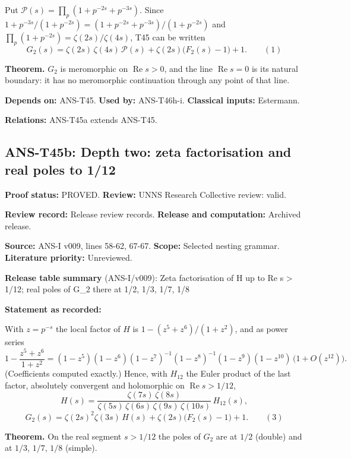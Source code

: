 \documentclass[
  11pt,
]{article}
\begin{document}
Put \(\mathcal P(s)=\prod_p(1+p^{-2s}+p^{-3s})\). Since
\(1+p^{-3s}/(1+p^{-2s})=(1+p^{-2s}+p^{-3s})/(1+p^{-2s})\) and
\(\prod_p(1+p^{-2s})=\zeta(2s)/\zeta(4s)\), T45 can be written
\[G_2(s)=\zeta(2s)\,\zeta(4s)\,\mathcal P(s)+\zeta(2s)\big(F_2(s)-1\big)+1.\qquad(1)\]

\textbf{Theorem.} \(G_2\) is meromorphic on \(\operatorname{Re}s>0\),
and the line \(\operatorname{Re}s=0\) is its natural boundary: it has no
meromorphic continuation through any point of that line.

\textbf{Depends on:} ANS-T45. \textbf{Used by:} ANS-T46h-i.
\textbf{Classical inputs:} Estermann.

\textbf{Relations:} ANS-T45a extends ANS-T45.

\hypertarget{ans-t45b-depth-two-zeta-factorisation-and-real-poles-to-112}{%
\subsection{ANS-T45b: Depth two: zeta factorisation and real poles to
1/12}\label{ans-t45b-depth-two-zeta-factorisation-and-real-poles-to-112}}

\textbf{Proof status:} PROVED. \textbf{Review:} UNNS Research Collective
review: valid.

\textbf{Review record:} Release review records. \textbf{Release and
computation:} Archived release.

\textbf{Source:} ANS-I v009, lines 58-62, 67-67. \textbf{Scope:}
Selected nesting grammar. \textbf{Literature priority:} Unreviewed.

\textbf{Release table summary} (ANS-I/v009): Zeta factorisation of H up
to Re s \textgreater{} 1/12; real poles of G\_2 there at 1/2, 1/3, 1/7,
1/8

\textbf{Statement as recorded:}

With \(z=p^{-s}\) the local factor of \(H\) is \(1-(z^5+z^6)/(1+z^2)\),
and as power series
\[1-\frac{z^5+z^6}{1+z^2}=(1-z^5)(1-z^6)(1-z^7)^{-1}(1-z^8)^{-1}(1-z^9)(1-z^{10})\,\big(1+O(z^{12})\big).\]
(Coefficients computed exactly.) Hence, with \(H_{12}\) the Euler
product of the last factor, absolutely convergent and holomorphic on
\(\operatorname{Re}s>1/12\),
\[H(s)=\frac{\zeta(7s)\,\zeta(8s)}{\zeta(5s)\,\zeta(6s)\,\zeta(9s)\,\zeta(10s)}\,H_{12}(s),\]
\[G_2(s)=\zeta(2s)^2\zeta(3s)\,H(s)+\zeta(2s)\big(F_2(s)-1\big)+1.\qquad(3)\]

\textbf{Theorem.} On the real segment \(s>1/12\) the poles of \(G_2\)
are at \(1/2\) (double) and at \(1/3\), \(1/7\), \(1/8\) (simple).
\end{document}
